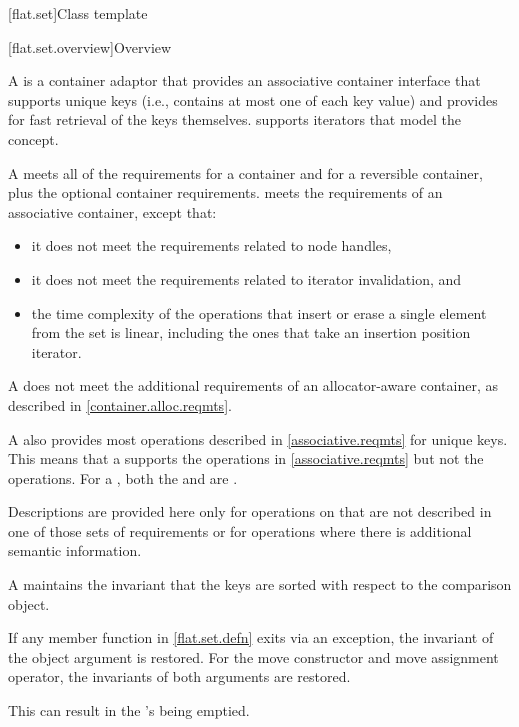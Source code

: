 [flat.set]{Class template }

[flat.set.overview]{Overview}

\pnum
{}%
A  is a container adaptor
that provides an associative container interface
that supports unique keys
(i.e., contains at most one of each key value) and
provides for fast retrieval of the keys themselves.
 supports iterators that model
the  concept.

\pnum
A  meets all of the requirements
for a container and
for a reversible container,
plus the optional container requirements.
 meets the requirements of
an associative container, except that:
\begin{itemize}
\item
it does not meet the requirements
related to node handles,
\item
it does not meet the requirements related to iterator invalidation, and
\item
the time complexity of the operations
that insert or erase a single element from the set
is linear,
including the ones that take an insertion position iterator.
\end{itemize}
\begin{note}
A  does not meet
the additional requirements of an allocator-aware container,
as described in \ref{container.alloc.reqmts}.
\end{note}

\pnum
A  also provides most operations
described in \ref{associative.reqmts} for unique keys.
This means that a  supports
the  operations in \ref{associative.reqmts}
but not the  operations.
For a ,
both the  and  are .

\pnum
Descriptions are provided here only for operations on 
that are not described in one of those sets of requirements or
for operations where there is additional semantic information.

\pnum
A  maintains the invariant that the keys are sorted with
respect to the comparison object.

\pnum
If any member function in \ref{flat.set.defn} exits via an exception,
the invariant of the object argument is restored.
For the move constructor and move assignment operator,
the invariants of both arguments are restored.
\begin{note}
This can result in the 's being emptied.
\end{note}

